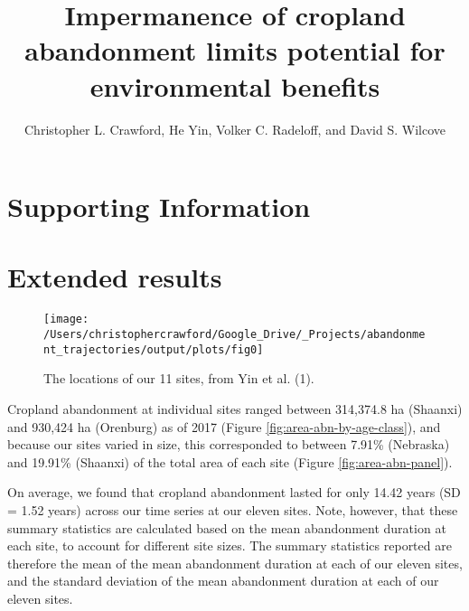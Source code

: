 \documentclass[9pt,twoside,lineno]{pnas-new}
\title{Impermanence of cropland abandonment limits potential for environmental benefits}
\author{Christopher L. Crawford, He Yin, Volker C. Radeloff, and David S. Wilcove}
\begin{document}
\verticaladjustment{-2pt}

\maketitle
\thispagestyle{firststyle}



\hypertarget{supporting-information}{%
\section{Supporting Information}\label{supporting-information}}

\listoffigures

\hypertarget{results-si}{%
\section{Extended results}\label{results-si}}



\begin{figure}
\texttt{[image: /Users/christophercrawford/Google\_Drive/\_Projects/abandonment\_trajectories/output/plots/fig0]} \caption{The locations of our 11 sites, from Yin et al. (1).}\label{fig:global-map}
\end{figure}

Cropland abandonment at individual sites ranged between 314,374.8 ha (Shaanxi) and 930,424 ha (Orenburg) as of 2017 (Figure \ref{fig:area-abn-by-age-class}), and because our sites varied in size, this corresponded to between 7.91\% (Nebraska) and 19.91\% (Shaanxi) of the total area of each site (Figure \ref{fig:area-abn-panel}).

On average, we found that cropland abandonment lasted for only 14.42 years (SD = 1.52 years) across our time series at our eleven sites.
Note, however, that these summary statistics are calculated based on the mean abandonment duration at each site, to account for different site sizes.
The summary statistics reported are therefore the mean of the mean abandonment duration at each of our eleven sites, and the standard deviation of the mean abandonment duration at each of our eleven sites.
\end{document}
